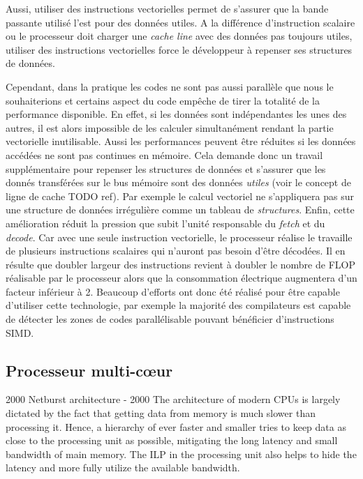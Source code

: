  Aussi, utiliser des instructions vectorielles permet de s'assurer que la bande passante utilisé l'est pour des données utiles. A la différence d'instruction scalaire ou le processeur doit charger une \textit{cache line} avec des données pas toujours utiles, utiliser des instructions vectorielles force le développeur à repenser ses structures de données.


Cependant, dans la pratique les codes ne sont pas aussi parallèle que nous le souhaiterions et certains aspect du code empêche de tirer la totalité de la performance disponible. En effet, si les données sont indépendantes les unes des autres, il est alors impossible de les calculer simultanément rendant la partie vectorielle inutilisable. Aussi les performances peuvent  être réduites si les données accédées ne sont pas continues en mémoire.  Cela demande donc un travail supplémentaire pour repenser les structures de données et s'assurer que les donnés transférées sur le bus mémoire sont des données \textit{utiles} (voir le concept de ligne de cache TODO ref). Par exemple le calcul vectoriel ne s'appliquera pas sur une structure de données irrégulière comme un tableau de \textit{structures}. Enfin, cette amélioration réduit la pression que subit l'unité responsable du \textit{fetch} et du \textit{decode}. Car avec une seule instruction vectorielle, le processeur réalise le travaille de plusieurs instructions scalaires qui n'auront pas besoin d'être décodées. Il en résulte que doubler largeur des instructions revient à doubler le nombre de FLOP réalisable par le processeur alors que la consommation électrique augmentera d'un facteur inférieur à 2. Beaucoup d'efforts ont donc été réalisé pour être capable d'utiliser cette technologie, par exemple la majorité des compilateurs est capable de détecter les zones de codes parallélisable pouvant bénéficier d'instructions SIMD.





\subsection{Processeur multi-cœur}
2000 Netburst architecture - 2000
The architecture of modern CPUs is largely dictated by the fact that getting data from memory is much
slower than processing it. Hence, a hierarchy of ever faster and smaller tries to keep data as close to the
processing unit as possible, mitigating the long latency and small bandwidth of main memory. The ILP in
the processing unit also helps to hide the latency and more fully utilize the available bandwidth.

